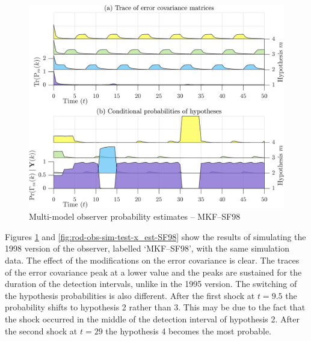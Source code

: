 \begin{figure}[htp]
	\centering
	\includegraphics[width=12cm]{images/rod_MKF_test_sim_MKF_SF98_prob.png}
	\caption{Multi-model observer probability estimates – MKF--SF98}
	\label{fig:rod-obs-sim-test-probs-SF98}
\end{figure}
Figures \ref{fig:rod-obs-sim-test-probs-SF98} and \ref{fig:rod-obs-sim-test-x_est-SF98} show the results of simulating the 1998 version of the observer, labelled `MKF--SF98', with the same simulation data. The effect of the modifications on the error covariance is clear. The traces of the error covariance peak at a lower value and the peaks are sustained for the duration of the detection intervals, unlike in the 1995 version. The switching of the hypothesis probabilities is also different. After the first shock at $t=9.5$ the probability shifts to hypothesis 2 rather than 3. This may be due to the fact that the shock occurred in the middle of the detection interval of hypothesis 2. After the second shock at $t=29$ the hypothesis 4 becomes the most probable.

